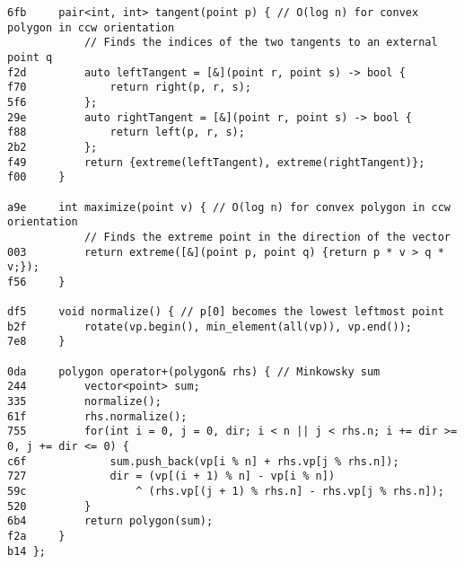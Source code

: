 \documentclass[11pt, a4paper, twoside]{article}
\begin{document}
\begin{lstlisting}
6fb 	pair<int, int> tangent(point p) { // O(log n) for convex polygon in ccw orientation
    		// Finds the indices of the two tangents to an external point q
f2d 		auto leftTangent = [&](point r, point s) -> bool {
f70 			return right(p, r, s);
5f6 		};
29e 		auto rightTangent = [&](point r, point s) -> bool {
f88 			return left(p, r, s);
2b2 		};
f49 		return {extreme(leftTangent), extreme(rightTangent)};
f00 	}
    
a9e 	int maximize(point v) { // O(log n) for convex polygon in ccw orientation
    		// Finds the extreme point in the direction of the vector
003 		return extreme([&](point p, point q) {return p * v > q * v;});
f56 	}
    
df5 	void normalize() { // p[0] becomes the lowest leftmost point 
b2f 		rotate(vp.begin(), min_element(all(vp)), vp.end());
7e8 	}
    
0da 	polygon operator+(polygon& rhs) { // Minkowsky sum
244 		vector<point> sum;
335 		normalize();
61f 		rhs.normalize();
755 		for(int i = 0, j = 0, dir; i < n || j < rhs.n; i += dir >= 0, j += dir <= 0) {
c6f 			sum.push_back(vp[i % n] + rhs.vp[j % rhs.n]);
727 			dir = (vp[(i + 1) % n] - vp[i % n]) 
59c 				^ (rhs.vp[(j + 1) % rhs.n] - rhs.vp[j % rhs.n]);
520 		}
6b4 		return polygon(sum);
f2a 	}
b14 };
\end{lstlisting}
\end{document}
